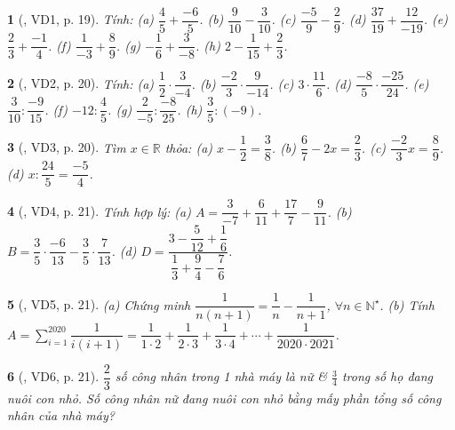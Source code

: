 \documentclass{article}
\newtheorem{baitoan}{}
\begin{document}
\begin{baitoan}[\cite{Binh_boi_duong_Toan_6_tap_2}, VD1, p. 19]
	Tính: (a) $\dfrac{4}{5} + \dfrac{-6}{5}$. (b) $\dfrac{9}{10} - \dfrac{3}{10}$. (c) $\dfrac{-5}{9} - \dfrac{2}{9}$. (d) $\dfrac{37}{19} + \dfrac{12}{-19}$. (e) $\dfrac{2}{3} + \dfrac{-1}{4}$. (f) $\dfrac{1}{-3} + \dfrac{8}{9}$. (g) $-\dfrac{1}{6} + \dfrac{3}{-8}$. (h) $2 - \dfrac{1}{15} + \dfrac{2}{3}$.
\end{baitoan}

\begin{baitoan}[\cite{Binh_boi_duong_Toan_6_tap_2}, VD2, p. 20]
	Tính: (a) $\dfrac{1}{2}\cdot\dfrac{3}{-4}$. (b) $\dfrac{-2}{3}\cdot\dfrac{9}{-14}$. (c) $3\cdot\dfrac{11}{6}$. (d) $\dfrac{-8}{5}\cdot\dfrac{-25}{24}$. (e) $\dfrac{3}{10}:\dfrac{-9}{15}$. (f) $-12:\dfrac{4}{5}$. (g) $\dfrac{2}{-5}:\dfrac{-8}{25}$. (h) $\dfrac{3}{5}:(-9)$.
\end{baitoan}

\begin{baitoan}[\cite{Binh_boi_duong_Toan_6_tap_2}, VD3, p. 20]
	Tìm $x\in\mathbb{R}$ thỏa: (a) $x - \dfrac{1}{2} = \dfrac{3}{8}$. (b) $\dfrac{6}{7} - 2x = \dfrac{2}{3}$. (c) $\dfrac{-2}{3}x = \dfrac{8}{9}$. (d) $x:\dfrac{24}{5} = \dfrac{-5}{4}$.
\end{baitoan}

\begin{baitoan}[\cite{Binh_boi_duong_Toan_6_tap_2}, VD4, p. 21]
	Tính hợp lý: (a) $A = \dfrac{3}{-7} + \dfrac{6}{11} + \dfrac{17}{7} - \dfrac{9}{11}$. (b) $B = \dfrac{3}{5}\cdot\dfrac{-6}{13} - \dfrac{3}{5}\cdot\dfrac{7}{13}$. (d) $D = \dfrac{3 - \dfrac{5}{12} + \dfrac{1}{6}}{\dfrac{1}{3} + \dfrac{9}{4} - \dfrac{7}{6}}$.
\end{baitoan}

\begin{baitoan}[\cite{Binh_boi_duong_Toan_6_tap_2}, VD5, p. 21]
	(a) Chứng minh $\dfrac{1}{n(n + 1)} = \dfrac{1}{n} - \dfrac{1}{n + 1}$, $\forall n\in\mathbb{N}^\star$. (b) Tính $A = \sum_{i=1}^{2020} \dfrac{1}{i(i + 1)} = \dfrac{1}{1\cdot2} + \dfrac{1}{2\cdot3} + \dfrac{1}{3\cdot4} + \cdots + \dfrac{1}{2020\cdot2021}$.
\end{baitoan}

\begin{baitoan}[\cite{Binh_boi_duong_Toan_6_tap_2}, VD6, p. 21]
	$\dfrac{2}{3}$ số công nhân trong 1 nhà máy là nữ \& $\frac{3}{4}$ trong số họ đang nuôi con nhỏ. Số công nhân nữ đang nuôi con nhỏ bằng mấy phần tổng số công nhân của nhà máy?
\end{baitoan}
\end{document}

